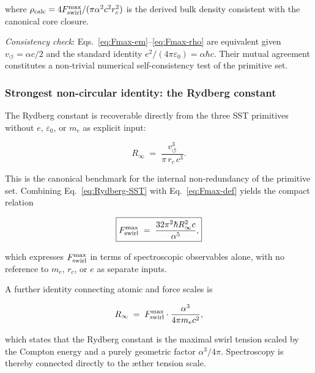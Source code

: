 \noindent
where $\rho_{\rm calc} = 4F_{\rm swirl}^{\max}/(\pi\alpha^2 c^2 r_c^2)$
is the derived bulk density consistent with the canonical core closure.

 \textit{Consistency check}:
Eqs.~\eqref{eq:Fmax-em}--\eqref{eq:Fmax-rho} are equivalent given
$v_\circlearrowleft = \alpha c/2$ and the standard identity
$e^2/(4\pi\varepsilon_0) = \alpha\hbar c$.
Their mutual agreement constitutes a non-trivial numerical
self-consistency test of the primitive set.

\subsubsection{Strongest non-circular identity: the Rydberg constant}

 The Rydberg constant is recoverable directly from
the three SST primitives without $e$, $\varepsilon_0$, or $m_e$ as
explicit input:

\begin{equation}
  R_\infty \;=\; \frac{v_\circlearrowleft^3}{\pi\,r_c\,c^3}.
  \label{eq:Rydberg-SST}
\end{equation}

\noindent
This is the canonical benchmark for the internal non-redundancy of the
primitive set. Combining Eq.~\eqref{eq:Rydberg-SST} with
Eq.~\eqref{eq:Fmax-def} yields the compact relation

\begin{equation}
  \boxed{
  F_{\rm swirl}^{\max}
  \;=\; \frac{32\pi^2\hbar R_\infty^2 c}{\alpha^5},
  }
  \label{eq:Fmax-Rydberg}
\end{equation}

\noindent
which expresses $F_{\rm swirl}^{\max}$ in terms of spectroscopic
observables alone, with no reference to $m_e$, $r_c$, or $e$ as
separate inputs.

 A further identity connecting atomic and
force scales is

\begin{equation}
  R_\infty \;=\; F_{\rm swirl}^{\max}
  \cdot \frac{\alpha^3}{4\pi m_e c^2},
  \label{eq:Rydberg-Fmax}
\end{equation}

\noindent
which states that the Rydberg constant is the maximal swirl tension
scaled by the Compton energy and a purely geometric factor $\alpha^3/4\pi$.
Spectroscopy is thereby connected directly to the æther tension scale.


